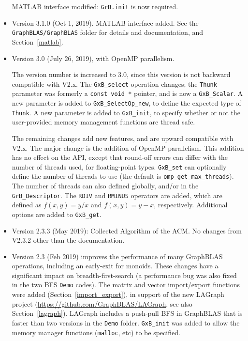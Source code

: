 \documentclass[12pt]{article}
\begin{document}
\begin{itemize}
    MATLAB interface modified:  \verb'GrB.init' is now required.

\item Version 3.1.0 (Oct 1, 2019).  MATLAB interface added.  See the \newline
    \verb'GraphBLAS/GraphBLAS' folder for details and documentation,
    and Section~\ref{matlab}.

\item Version 3.0 (July 26, 2019), with OpenMP parallelism.

The version number is increased to 3.0, since
this version is not backward compatible with V2.x.  The \verb'GxB_select'
operation changes; the \verb'Thunk' parameter was formerly a
\verb'const void *' pointer, and is now a \verb'GxB_Scalar'.  A new parameter
is added to \verb'GxB_SelectOp_new', to define the expected type of
\verb'Thunk'.  A new parameter is added to \verb'GxB_init', to specify whether
or not the user-provided memory management functions are thread safe.

The remaining changes add new features, and are upward compatible with V2.x.
The major change is the addition of OpenMP parallelism.  This addition has no
effect on the API, except that round-off errors can differ with the number of
threads used, for floating-point types.  \verb'GxB_set' can optionally define
the number of threads to use (the default is \verb'omp_get_max_threads').  The
number of threads can also defined globally, and/or in the
\verb'GrB_Descriptor'.  The \verb'RDIV' and \verb'RMINUS' operators are added,
which are defined as $f(x,y)=y/x$ and $f(x,y)=y-x$, respectively.  Additional
options are added to \verb'GxB_get'.

\item Version 2.3.3 (May 2019): Collected Algorithm of the ACM.
No changes from V2.3.2 other than the documentation.

\item Version 2.3 (Feb 2019) improves the performance of many GraphBLAS
operations, including an early-exit for monoids.  These changes have a
significant impact on breadth-first-search (a performance bug was also fixed in
the two BFS \verb'Demo' codes).  The matrix and vector import/export functions
were added (Section~\ref{import_export}), in support of the new LAGraph project
(\url{https://github.com/GraphBLAS/LAGraph}, see also Section~\ref{lagraph}).
LAGraph includes a push-pull BFS in GraphBLAS that is faster than two versions
in the \verb'Demo' folder.  \verb'GxB_init' was added to allow the memory
manager functions (\verb'malloc', etc) to be specified.


\end{itemize}
\end{document}
